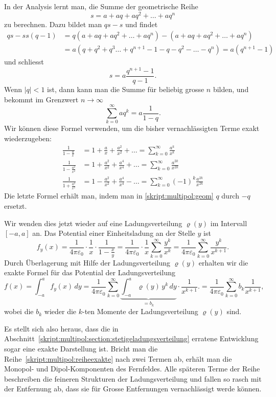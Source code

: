 In der Analysis lernt man, die Summe der geometrische Reihe 
\[
s=a+aq+aq^2+\dots + aq^n
\]
zu berechnen.
Dazu bildet man $qs - s$ und findet
\begin{align*}
qs-s
s(q-1)
&=
q(a+aq+aq^2+\dots + aq^n)-(a+aq+aq^2+\dots + aq^n)
\\
&=
a(q+q^2+q^3\dots+q^{n+1}-1-q-q^2-\dots-q^n)
=
a(q^{n+1}-1)
\end{align*}
und schliesst
\[
s=a\frac{q^{n+1}-1}{q-1}.
\]
Wenn $|q|<1$ ist, dann kann man die Summe für beliebig grosse $n$ bilden,
und bekommt im Grenzwert $n\to\infty$
\begin{equation}
\sum_{k=0}^\infty aq^k = a\frac{1}{1-q}.
\label{skript:multipol:geom}
\end{equation}
Wir können diese Formel verwenden, um die bisher vernachlässigten Terme
exakt wiederzugeben:
\begin{align*}
\frac{1}{1-\frac{a}{x}}
&=
1+\frac{a}{x}+\frac{a^2}{x^2}+\dots
=
\sum_{k=0}^\infty \frac{a^k}{x^k}
\\
\frac{1}{1-\frac{a^2}{x^2}}
&=
1+\frac{a^2}{x^2}+\frac{a^4}{x^4}+\dots
=
\sum_{k=0}^\infty \frac{a^{2k}}{x^{2k}}
\\
\frac{1}{1+\frac{a^2}{x^2}}
&=
1-\frac{a^2}{x^2}+\frac{a^4}{x^4}-\dots
=
\sum_{k=0}^\infty (-1)^k\frac{a^{2k}}{x^{2k}}
\end{align*}
Die letzte Formel erhält man, indem man in \eqref{skript:multipol:geom}
$q$ durch $-q$ ersetzt.

Wir wenden dies jetzt wieder auf eine Ladungsverteilung
$\varrho(y)$ im Intervall $[-a,a]$ an.
Das Potential einer Einheitsladung an der Stelle $y$ ist
\[
f_y(x)
=
\frac1{4\pi\varepsilon_0}\cdot \frac{1}{x}\cdot\frac{1}{1-\frac{x}{y}}
=
\frac1{4\pi\varepsilon_0}\cdot \frac{1}{x}
\sum_{k=0}^\infty \frac{y^k}{x^k}
=
\frac1{4\pi\varepsilon_0}
\sum_{k=0}^\infty \frac{y^k}{x^{k+1}}.
\]
Durch Überlagerung mit Hilfe der Ladungsverteilung $\varrho(y)$ 
erhalten wir die exakte Formel für das Potential der Ladungsverteilung
\begin{equation}
f(x)
=
\int_{-a}^af_y(x)\,dy
=
\frac{1}{4\pi\varepsilon_0}
\sum_{k=0}^\infty
\underbrace{\int_{-a}^a\varrho(y)\,y^k\,dy}_{\displaystyle =b_k}
\cdot\frac{1}{x^{k+1}}.
=
\frac{1}{4\pi\varepsilon_0}
\sum_{k=0}^\infty b_k\frac{1}{x^{k+1}},
\label{skript:multipol:reiheexakte}
\end{equation}
wobei die $b_k$ wieder die $k$-ten Momente der Ladungsverteilung
$\varrho(y)$ sind.

Es stellt sich also heraus, dass die in
Abschnitt~\ref{skript:multipol:section:stetigeladungsverteilung}
erratene Entwicklung sogar eine exakte Darstellung ist.
Bricht man die Reihe~\eqref{skript:multipol:reiheexakte} nach zwei
Termen ab, erhält man die Monopol- und Dipol-Komponenten des
Fernfeldes.
Alle späteren Terme der Reihe beschreiben die feineren Strukturen
der Ladungsverteilung und fallen so rasch mit der Entfernung ab,
dass sie für Grosse Entfernungen vernachlässigt werde können.

